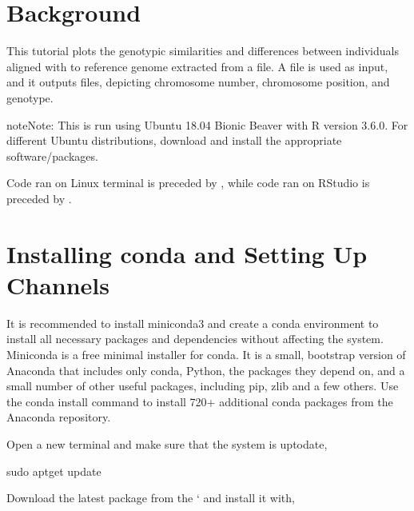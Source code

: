 \documentclass[letterpaper,10pt,english]{sphinxhowto}
\begin{document}
\pagestyle{plain}
\sphinxtableofcontents
\pagestyle{normal}
\label{\detokenize{index::doc}}



\part{Background}
\label{\detokenize{index:background}}
This tutorial plots the genotypic similarities and differences between individuals aligned with to reference genome extracted from a  file. A  file is used as input, and it outputs  files, depicting chromosome number, chromosome position, and genotype.

\begin{sphinxadmonition}{note}{Note:}
This is run using Ubuntu 18.04 Bionic Beaver with R version 3.6.0. For different Ubuntu distributions, download and install the appropriate software/packages.

Code ran on Linux terminal is preceded by \sphinxcode{\sphinxupquote{\$}}, while code ran on RStudio is preceded by \sphinxcode{\sphinxupquote{\textgreater{}}}.
\end{sphinxadmonition}


\part{Installing conda and Setting Up Channels}
\label{\detokenize{index:installing-conda-and-setting-up-channels}}
It is recommended to install miniconda3 and create a conda environment to install all necessary packages and dependencies without affecting the system. Miniconda is a free minimal installer for conda. It is a small, bootstrap version of Anaconda that includes only conda, Python, the packages they depend on, and a small number of other useful packages, including pip, zlib and a few others. Use the conda install command to install 720+ additional conda packages from the Anaconda repository.

Open a new terminal  and make sure that the system is up\sphinxhyphen{}to\sphinxhyphen{}date,

\begin{sphinxVerbatim}[commandchars=\\\{\}]
\PYGZdl{} sudo apt\PYGZhy{}get update
\end{sphinxVerbatim}

Download the latest package from the ‘ and install it with,
\end{document}
